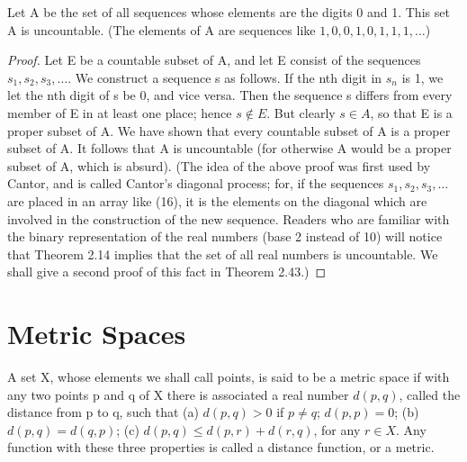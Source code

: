 \begin{theorem} %
  \label{thm:chap2:binary_sequences_uncountable}
  Let A be the set of all sequences whose elements are the digits 0
  and 1. This set A is uncountable.
  (The elements of A are sequences like $1, 0, 0, 1, 0, 1, 1, 1, \dots$)
  \begin{proof}
    Let E be a countable subset of A, and let E consist of the
    sequences $s_1, s_2, s_3, \dots$. We construct a sequence s as
    follows. If the nth digit in $s_n$ is 1, we let the nth digit of
    s be 0, and vice versa. Then the sequence s differs from every
    member of E in at least one place; hence $s \notin E$. But
    clearly $s \in A$, so that E is a proper subset of A.
    We have shown that every countable subset of A is a proper subset
    of A. It follows that A is uncountable (for otherwise A would be
    a proper subset of A, which is absurd).
    (The idea of the above proof was first used by Cantor, and is
      called Cantor's diagonal process; for, if the sequences $s_1,
      s_2, s_3, \dots$ are placed in an array like (16), it is the
      elements on the diagonal which are involved in the construction
      of the new sequence.
      Readers who are familiar with the binary representation of the
      real numbers (base 2 instead of 10) will notice that Theorem 2.14
      implies that the set of all real numbers is uncountable. We shall
    give a second proof of this fact in Theorem 2.43.)
  \end{proof}
\end{theorem}



\section{Metric Spaces}
\label{sec:chap2:metric_spaces}

\begin{definition} %
  \label{def:chap2:metric_space}
  A set X, whose elements we shall call points, is said to be a
  metric space if with any two points p and q of X there is
  associated a real number $d(p, q)$, called the distance from p to q, such that
  (a) $d(p, q) > 0$ if $p \ne q$; $d(p, p) = 0$;
  (b) $d(p, q) = d(q, p)$;
  (c) $d(p, q) \le d(p, r) + d(r, q)$, for any $r \in X$.
  Any function with these three properties is called a distance
  function, or a metric.
\end{definition}

